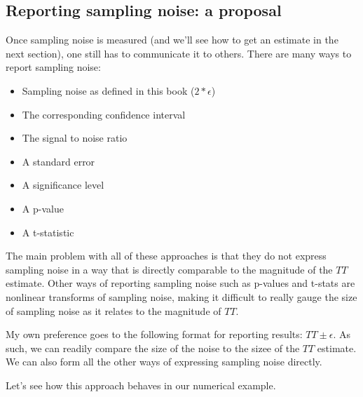 \documentclass[]{book}
\providecommand{\tightlist}{%
  \setlength{\itemsep}{0pt}\setlength{\parskip}{0pt}}
\theoremstyle{definition}
\theoremstyle{definition}
\theoremstyle{definition}
\theoremstyle{remark}
\let\BeginKnitrBlock\begin \let\EndKnitrBlock\end
\begin{document}
\hypertarget{reporting-sampling-noise-a-proposal}{%
\subsection{Reporting sampling noise: a proposal}\label{reporting-sampling-noise-a-proposal}}

Once sampling noise is measured (and we'll see how to get an estimate in the next section), one still has to communicate it to others.
There are many ways to report sampling noise:

\begin{itemize}
\tightlist
\item
  Sampling noise as defined in this book (\(2*\epsilon\))
\item
  The corresponding confidence interval
\item
  The signal to noise ratio
\item
  A standard error
\item
  A significance level
\item
  A p-value
\item
  A t-statistic
\end{itemize}

The main problem with all of these approaches is that they do not express sampling noise in a way that is directly comparable to the magnitude of the \(TT\) estimate.
Other ways of reporting sampling noise such as p-values and t-stats are nonlinear transforms of sampling noise, making it difficult to really gauge the size of sampling noise as it relates to the magnitude of \(TT\).

My own preference goes to the following format for reporting results: \(TT \pm \epsilon\).
As such, we can readily compare the size of the noise to the sizee of the \(TT\) estimate.
We can also form all the other ways of expressing sampling noise directly.

\BeginKnitrBlock{example}
\protect\hypertarget{exm:unnamed-chunk-37}{}{\label{exm:unnamed-chunk-37} }Let's see how this approach behaves in our numerical example.
\EndKnitrBlock{example}
\end{document}
